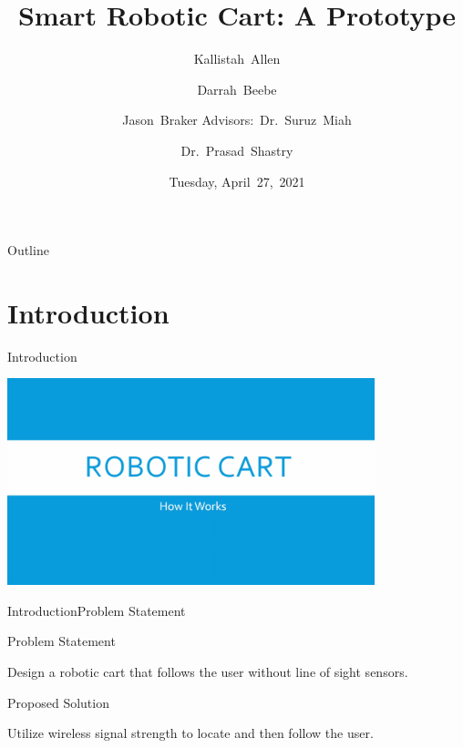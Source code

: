 \documentclass{beamer}
\title[Smart Robotic Cart]{Smart Robotic Cart: A Prototype}
\author[K.~Allen, D.~Beebe, J.~Braker]{Kallistah~Allen \and Darrah~Beebe \and Jason~Braker
Advisors:~Dr.~Suruz~Miah \and Dr.~Prasad~Shastry}
\institute[Bradley University] %
{
  Department of Electrical and Computer Engineering\\
  Bradley University\\
  1501 W. Bradley Avenue\\
  Peoria, IL, 61625, USA
}
\date[April~20,~2021]{Tuesday, April~27,~2021}
\begin{document}
\begin{frame}
  \titlepage
\end{frame}

\begin{frame}{Outline} 
  \tableofcontents%
\end{frame}

\section{Introduction}

\begin{frame}{Introduction}{}
 \begin{center}
    \href{videos/proposalVideo.mp4}{\includegraphics[width=0.8\textwidth]{figs/img/proposalVideoTitle}}
  \end{center}
\end{frame}

\begin{frame}{Introduction}{Problem Statement}
  \begin{block}{Problem Statement}
    \begin{LARGE}
      Design a robotic cart that follows the user without line of sight sensors.
    \end{LARGE}
  \end{block}
  \pause
  \begin{block}{Proposed Solution}
    \begin{LARGE}
      Utilize wireless signal strength to locate and then follow the user.
    \end{LARGE}
  \end{block}
\end{frame}

\end{document}
